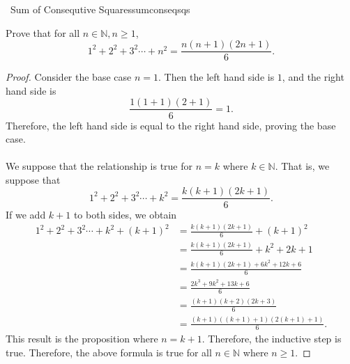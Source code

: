     \begin{example}{\Difficulty\,\Difficulty\,\,Sum of Consequtive Squares}{sumconseqsqs}
    
        Prove that for all \(n\in\mathbb{N}, n \geq 1\),
        \begin{equation*}
            1^2+2^2+3^2\cdots+n^2=\frac{n(n+1)(2n+1)}{6}.
        \end{equation*}
        \begin{proof}
            Consider the base case \(n=1\). Then the left hand side is \(1\), and the right hand side is
            \begin{equation*}
                \frac{1(1+1)(2+1)}{6}=1.
            \end{equation*}
            Therefore, the left hand side is equal to the right hand side, proving the base case.
            \\
            \\
            We suppose that the relationship is true for \(n=k\) where \(k\in\mathbb{N}\). That is, we suppose that
            \begin{equation*}
                1^2+2^2+3^2\cdots+k^2=\frac{k(k+1)(2k+1)}{6}.
            \end{equation*}
            If we add \(k+1\) to both sides, we obtain
            \begin{align*}
                1^2+2^2+3^2\cdots+k^2+(k+1)^2&=\frac{k(k+1)(2k+1)}{6}+(k+1)^2 \\
                &=\frac{k(k+1)(2k+1)}{6}+k^2+2k+1 \\
                &=\frac{k(k+1)(2k+1)+6k^2+12k+6}{6} \\
                &=\frac{2k^3+9k^2+13k+6}{6} \\
                &=\frac{(k+1)(k+2)(2k+3)}{6} \\
                &=\frac{(k+1)((k+1)+1)(2(k+1)+1)}{6}.
            \end{align*}
            This result is the proposition where \(n=k+1\). Therefore, the inductive step is true. Therefore, the above formula is true for all \(n\in\mathbb{N}\) where \(n \geq 1\).
        \end{proof}
    
    \end{example}
    \pagebreak
